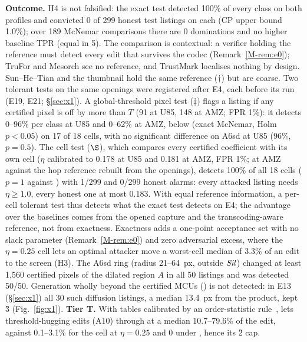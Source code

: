 \documentclass[10pt]{article}
\newcommand{\mainref}[1]{\ref{M-#1}}
\begin{document}
\textbf{Outcome.} H4 is not falsified: the exact test detected 100\% of every class on both profiles and convicted 0
of 299 honest test listings on each (CP upper bound 1.0\%); over 189 McNemar comparisons there are 0 dominations and no
higher baseline TPR (equal in 5). The comparison is contextual: a verifier holding the reference must
detect every edit that survives the codec (Remark~\mainref{rem:e0}); TruFor and Mesorch see no reference, and
TrustMark localises nothing by design. Sun--He--Tian and the thumbnail hold the same reference ($\dagger$) but are coarse.
Two tolerant tests on the same openings were registered after E4, each before its run (E19, E21; \S\ref{sec:x1}).
A global-threshold pixel test ($\ddagger$) flags a listing if any certified pixel is off by more than $T$ (91 at U85,
148 at AMZ; FPR 1\%): it detects 0--96\% per class at U85 and 0--62\% at AMZ, below \sys{} (exact McNemar, Holm
$p<0.05$) on 17 of 18 cells, with no significant difference on A6sd at U85 (96\%, $p=0.5$). The \Eone{} cell test
($\S$), which compares every certified coefficient with its own cell ($\eta$ calibrated to 0.178 at U85 and 0.181 at
AMZ, FPR 1\%; at AMZ against the hop reference rebuilt from the openings), detects 100\% of all 18 cells ($p=1$ against
\sys{}) with 1/299 and 0/299 honest alarms: every attacked listing needs $\eta\ge1.0$, every honest one at most 0.183.
With equal reference information, a per-cell tolerant test thus detects what the exact test detects on E4; the
advantage over the baselines comes from the opened capture and the transcoding-aware reference, not from exactness.
Exactness adds a one-point acceptance set with no slack parameter (Remark~\mainref{rem:e0}) and zero adversarial excess, where the $\eta=0.25$ cell lets
an optimal attacker move a worst-cell median of 3.3\% of an edit to the screen (H3).
The A6sd ring (radius 21--64~px, outside $\mathit{Sil}$) changed at least 1,560 certified pixels of the dilated region $A$ in
all 50 listings and was detected 50/50. Generation wholly beyond the certified MCUs
() is not detected: in E13 (\S\ref{sec:x1}) all 30 such diffusion listings, a median 13.4~px from the product, kept \G{3}
(Fig.~\ref{fig:x1}).
\textbf{Tier T.} With tables calibrated by an order-statistic rule~\cite{tong2018neymanpearson}, \tierT{} lets
threshold-hugging edits (A10) through at a median 10.7--79.6\% of the edit, against 0.1--3.1\% for the \Eone{} cell at
$\eta=0.25$ and 0 under \Ezero{}, hence its \G{2} cap.
\end{document}
